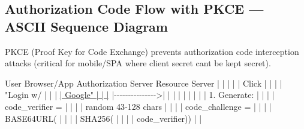 \documentclass[11pt]{article}
\newenvironment{Shaded}{\begin{snugshade}}{\end{snugshade}}
\newcommand{\DecValTok}[1]{\textcolor[rgb]{0.96,0.45,0.00}{#1}}
\newcommand{\ErrorTok}[1]{\textcolor[rgb]{0.85,0.27,0.33}{\underline{#1}}}
\newcommand{\FloatTok}[1]{\textcolor[rgb]{0.96,0.45,0.00}{#1}}
\newcommand{\NormalTok}[1]{\textcolor[rgb]{0.81,0.81,0.76}{#1}}
\newcommand{\OperatorTok}[1]{\textcolor[rgb]{0.81,0.81,0.76}{#1}}
\newcommand{\StringTok}[1]{\textcolor[rgb]{0.96,0.31,0.31}{#1}}
\begin{document}
\subsection{Authorization Code Flow with PKCE --- ASCII Sequence Diagram}\label{authorization-code-flow-with-pkce--ascii-sequence-diagram}

PKCE (Proof Key for Code Exchange) prevents authorization code interception attacks (critical for mobile/SPA where client secret can\textquotesingle t be kept secret).


\begin{Shaded}
\begin{Highlighting}[]
\NormalTok{User          Browser}\OperatorTok{/}\NormalTok{App           Authorization Server         Resource Server}
  \OperatorTok{|}                \OperatorTok{|}                        \OperatorTok{|}                          \OperatorTok{|}
  \OperatorTok{|}\NormalTok{  Click         }\OperatorTok{|}                        \OperatorTok{|}                          \OperatorTok{|}
  \OperatorTok{|} \StringTok{"Login w/      |                        |                          |}
\ErrorTok{  |  Google"       |                        |                          |}
  \OperatorTok{|{-}{-}{-}{-}{-}{-}{-}{-}{-}{-}{-}{-}{-}{-}{-}\textgreater{}|}                        \OperatorTok{|}                          \OperatorTok{|}
  \OperatorTok{|}                \OperatorTok{|}                        \OperatorTok{|}                          \OperatorTok{|}
  \OperatorTok{|}                \OperatorTok{|} \FloatTok{1.}\NormalTok{ Generate:           }\OperatorTok{|}                          \OperatorTok{|}
  \OperatorTok{|}                \OperatorTok{|}\NormalTok{    code\_verifier }\OperatorTok{=}     \OperatorTok{|}                          \OperatorTok{|}
  \OperatorTok{|}                \OperatorTok{|}\NormalTok{    random }\DecValTok{43}\OperatorTok{{-}}\DecValTok{128}\NormalTok{ chars }\OperatorTok{|}                          \OperatorTok{|}
  \OperatorTok{|}                \OperatorTok{|}\NormalTok{    code\_challenge }\OperatorTok{=}    \OperatorTok{|}                          \OperatorTok{|}
  \OperatorTok{|}                \OperatorTok{|}\NormalTok{    BASE64URL(          }\OperatorTok{|}                          \OperatorTok{|}
  \OperatorTok{|}                \OperatorTok{|}\NormalTok{      SHA256(           }\OperatorTok{|}                          \OperatorTok{|}
  \OperatorTok{|}                \OperatorTok{|}\NormalTok{        code\_verifier)) }\OperatorTok{|}                          \OperatorTok{|}

\end{Highlighting}
\end{Shaded}
\end{document}
